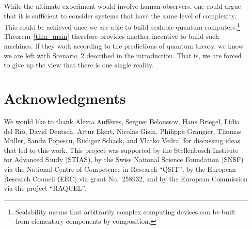 \documentclass{article}
\theoremstyle{plain}
\theoremstyle{definition}
\begin{document}
While the ultimate experiment would involve human observers, one could argue that it is sufficient to consider systems that have the same   level of complexity.  This could be achieved  once we are able to build scalable quantum computers.\footnote{Scalability means that arbitrarily complex computing devices can be built from elementary components by composition.}  Theorem~\ref{thm_main} therefore provides another incentive to build such machines. If they  work according to the predictions of quantum theory, we know we are left with Scenario~2 described in the introduction. That is, we are forced to give up the view that there is one single reality. 


\section*{Acknowledgments}

We would like to thank Alexia Auff\`eves, Serguei Beloussov, Hans Briegel, L\'idia del Rio, David Deutsch, Artur Ekert,  Nicolas Gisin, Philippe Grangier, Thomas M\"uller, Sandu Popescu, R\"udiger Schack, and Vlatko Vedral for discussing ideas that led to this work. This project was supported by the Stellenbosch Institute for Advanced Study (STIAS), by the Swiss National Science Foundation (SNSF) via the National Centre of Competence in Research ``QSIT'', by the European Research Council (ERC) via grant No.\ 258932,  and by the European Commission via the project ``RAQUEL''.  
\end{document}
